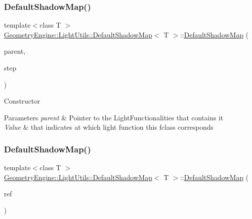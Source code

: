 \subsubsection{\texorpdfstring{DefaultShadowMap()}{DefaultShadowMap()}\hspace{0.1cm}{\footnotesize\ttfamily [1/2]}}
{\footnotesize\ttfamily template$<$class T $>$ \\
\mbox{\hyperlink{class_geometry_engine_1_1_light_utils_1_1_default_shadow_map}{Geometry\+Engine\+::\+Light\+Utils\+::\+Default\+Shadow\+Map}}$<$ T $>$\+::\mbox{\hyperlink{class_geometry_engine_1_1_light_utils_1_1_default_shadow_map}{Default\+Shadow\+Map}} (\begin{DoxyParamCaption}\item[{\mbox{\hyperlink{class_geometry_engine_1_1_light_utils_1_1_light_component_manager}{Light\+Component\+Manager}} $\ast$}]{parent,  }\item[{\mbox{\hyperlink{namespace_geometry_engine_1_1_light_utils_a16eb370137c2fd151e6f8e1d07cd23e0}{Light\+Shading}}}]{step }\end{DoxyParamCaption})\hspace{0.3cm}{\ttfamily [inline]}}

Constructor 
\begin{DoxyParams}{Parameters}
{\em parent} & Pointer to the Light\+Functionalities that contains it \\
\hline
{\em Value} & that indicates at which light function this fclass corresponds \\
\hline
\end{DoxyParams}
\mbox{\label{class_geometry_engine_1_1_light_utils_1_1_default_shadow_map_ac71df76110848bdd359ddf1d6b385578}} 
\subsubsection{\texorpdfstring{DefaultShadowMap()}{DefaultShadowMap()}\hspace{0.1cm}{\footnotesize\ttfamily [2/2]}}
{\footnotesize\ttfamily template$<$class T $>$ \\
\mbox{\hyperlink{class_geometry_engine_1_1_light_utils_1_1_default_shadow_map}{Geometry\+Engine\+::\+Light\+Utils\+::\+Default\+Shadow\+Map}}$<$ T $>$\+::\mbox{\hyperlink{class_geometry_engine_1_1_light_utils_1_1_default_shadow_map}{Default\+Shadow\+Map}} (\begin{DoxyParamCaption}\item[{const \mbox{\hyperlink{class_geometry_engine_1_1_light_utils_1_1_light_shading_component}{Light\+Shading\+Component}} \&}]{ref }\end{DoxyParamCaption})\hspace{0.3cm}{\ttfamily [inline]}}

